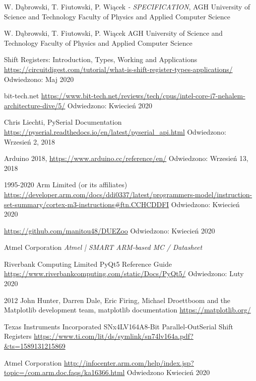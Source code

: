 \begin{thebibliography}{99}
	    W. Dąbrowski, T. Fiutowski, P. Wiącek 
	    \textit{ - SPECIFICATION},
	    AGH University of Science and Technology
        Faculty of Physics and Applied Computer Science 

	    W. Dąbrowski, T. Fiutowski, P. Wiącek 
        \textit{}
        AGH University of Science and Technology
        Faculty of Physics and Applied Computer Science 

        Shift Registers: Introduction, Types, Working and Applications
        \url{https://circuitdigest.com/tutorial/what-is-shift-register-types-applications/}
        Odwiedzono: Maj 2020

        bit-tech.net
        \url{https://www.bit-tech.net/reviews/tech/cpus/intel-core-i7-nehalem-architecture-dive/5/}
        Odwiedzono:
        Kwiecień 2020

        Chris Liechti,	
        PySerial Documentation
	\url{https://pyserial.readthedocs.io/en/latest/pyserial_api.html}
        Odwiedzono: Wrzesień 2, 2018
        
	 Arduino 2018,
	 \url{https://www.arduino.cc/reference/en/}
        Odwiedzono: Wrzesień 13, 2018	 
        
        1995-2020 Arm Limited (or its affiliates)
        \url{https://developer.arm.com/docs/ddi0337/latest/programmers-model/instruction-set-summary/cortex-m3-instructions#ftn.CCHCDDFI}
        Odwiedzono: Kwiecień 2020

        \url{https://github.com/manitou48/DUEZoo}
        Odwiedzono: Kwiecień 2020

        Atmel Corporation
        \textit{Atmel | SMART ARM-based MC  / Datasheet}

        Riverbank Computing Limited
        PyQt5 Reference Guide
        \url{https://www.riverbankcomputing.com/static/Docs/PyQt5/}
        Odwiedzono: Luty 2020

        2012 John Hunter, Darren Dale, Eric Firing, Michael Droettboom and the Matplotlib development team,
        matplotlib documentation
        \url{https://matplotlib.org/}

        Texas Instruments Incorporated
        SNx4LV164A8-Bit Parallel-OutSerial Shift Registers
        \url{https://www.ti.com/lit/ds/symlink/sn74lv164a.pdf?&ts=1589131215869}

        Atmel Corporation
        \url{http://infocenter.arm.com/help/index.jsp?topic=/com.arm.doc.faqs/ka16366.html}
        Odwiedzono Kwiecień 2020

\end{thebibliography}

